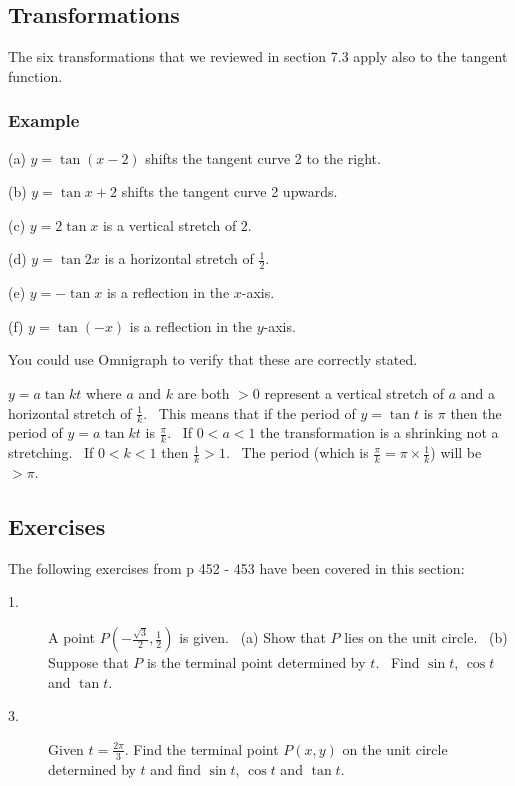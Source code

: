 \subsection{Transformations}
The six transformations that we reviewed in section 7.3 apply also to the tangent function. 

\subsubsection{Example}
(a) $y =\tan  \left (x -2\right )$ shifts the tangent curve 2 to the right. 

(b) $y =\tan  x +2$ shifts the tangent curve 2 upwards. 

(c) $y =2 \tan  x$ is a vertical stretch of $2$. 

(d) $y =\tan  2 x$ is a horizontal stretch of $\frac{1}{2}$. 

(e) $y = -\tan  x$ is a reflection in the $x$-axis. 

(f) $y =\tan  \left ( -x\right )$ is a reflection in the $y$-axis. 

You could use Omnigraph to verify that these are correctly stated. 

$y =a \tan  k t$ where $a$ and $k$ are both $ >0$ represent a vertical stretch of $a$ and a horizontal stretch of $\frac{1}{k}$. \ This means that if the period of $y =\tan  t$ is $\pi $ then the period of $y =a \tan  k t$ is $\frac{\pi }{k}$. \ If $0 <a <1$ the transformation is a shrinking not a stretching. \ If $0 <k <1$ then $\frac{1}{k} >1$. \ The period (which is $\frac{\pi }{k} =\pi  \times \frac{1}{k}$) will be $ >\pi $. 

\subsection{Exercises}
The following exercises from p 452 - 453 have been covered in this section: 


\begin{description}
\item [1.] A point $P ( -\frac{\sqrt{3}}{2} ,\frac{1}{2})$ is given. \ (a) Show that $P$ lies on the unit circle. \ (b) Suppose that $P$ is the terminal point determined by $t$. \ Find $\sin  t$, $\cos  t$ and $\tan  t\text{.}$ 

\item [3.] Given $t =\frac{2 \pi }{3}\text{.}$ Find the terminal point $P (x ,y)$ on the unit circle determined by $t$ and find $\sin  t$, $\cos  t$ and $\tan  t\text{.}$ \end{description}

